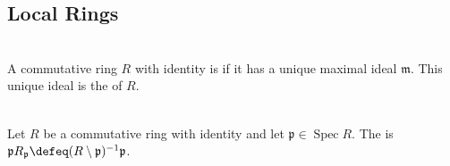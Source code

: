 \subsection{Local Rings}

\begin{definition} \label{def:local-ring} \\
A commutative ring $R$ with identity is  if it has a unique maximal ideal $\mathfrak{m}$. This unique ideal is the  of $R$.
\end{definition}

\begin{definition} \label{def:localized-prime-ideal} \\
Let $R$ be a commutative ring with identity and let $\mathfrak{p}\in\operatorname{Spec}R$. The  is $\mathfrak{p}R_{\mathfrak{p}}\defeq(R\setminus\mathfrak{p})^{-1}\mathfrak{p}$.
\end{definition}

